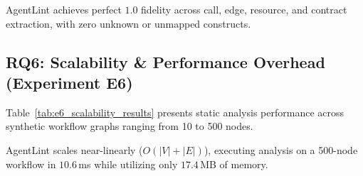 AgentLint achieves perfect $1.0$ fidelity across call, edge, resource, and contract extraction, with zero unknown or unmapped constructs.

\subsection{RQ6: Scalability \& Performance Overhead (Experiment E6)}
Table~\ref{tab:e6_scalability_results} presents static analysis performance across synthetic workflow graphs ranging from 10 to 500 nodes.

\begin{table}[h]
\centering
\caption{AgentLint Scalability & Resource Utilization (Experiment E6)}
\label{tab:e6_scalability_results}
\end{table}

AgentLint scales near-linearly ($O(|V| + |E|)$), executing analysis on a 500-node workflow in $10.6$\,ms while utilizing only $17.4$\,MB of memory.

